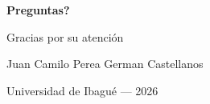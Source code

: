 \documentclass[10pt, aspectratio=169, xcolor=dvipsnames]{beamer}
\begin{document}
{
\begin{frame}[plain]
\centering
\vspace{1.3cm}
{\color{white}\Huge\bfseries \textquestiondown Preguntas?\par}
\vspace{1.3cm}
{\color{white}\Large Gracias por su atenci\'on\par}
\vspace{1.0cm}
{\color{white}\normalsize Juan Camilo Perea \quad\textbar\quad German Castellanos\par}
{\color{white!85!uibblue}\small Universidad de Ibagu\'e --- 2026\par}
\end{frame}}
\end{document}

